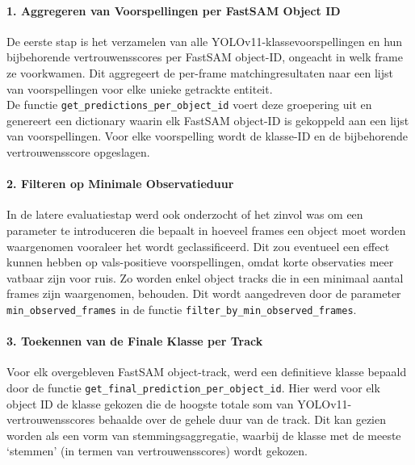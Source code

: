 \paragraph{1. Aggregeren van Voorspellingen per FastSAM Object ID}
De eerste stap is het verzamelen van alle YOLOv11-klassevoorspellingen en hun bijbehorende 
vertrouwensscores per FastSAM object-ID, 
ongeacht in welk frame ze voorkwamen. 
Dit aggregeert de per-frame matchingresultaten naar een lijst van voorspellingen voor elke unieke getrackte entiteit.\\
De functie \texttt{get\_predictions\_per\_object\_id} voert deze groepering uit en genereert een dictionary waarin elk FastSAM object-ID is gekoppeld aan een lijst van voorspellingen.
Voor elke voorspelling wordt de klasse-ID en de bijbehorende vertrouwensscore opgeslagen.

\paragraph{2. Filteren op Minimale Observatieduur}
In de latere evaluatiestap werd ook onderzocht of het zinvol was om een parameter te introduceren die bepaalt in hoeveel frames een object moet worden waargenomen
vooraleer het wordt geclassificeerd. Dit zou eventueel een effect kunnen hebben op vals-positieve voorspellingen, omdat korte observaties meer vatbaar zijn voor ruis.
Zo worden enkel object tracks die in een minimaal aantal frames zijn waargenomen, behouden.
Dit wordt aangedreven door de parameter \texttt{min\_observed\_frames} in de functie \texttt{filter\_by\_min\_observed\_frames}.

\paragraph{3. Toekennen van de Finale Klasse per Track}
Voor elk overgebleven FastSAM object-track, werd een definitieve klasse bepaald door de functie \texttt{get\_final\_prediction\_per\_object\_id}. 
Hier werd voor elk object ID de klasse gekozen die de hoogste totale som van YOLOv11-vertrouwensscores 
behaalde over de gehele duur van de track. 
Dit kan gezien worden als een vorm van stemmingsaggregatie, 
waarbij de klasse met de meeste `stemmen' (in termen van vertrouwensscores) wordt gekozen.

